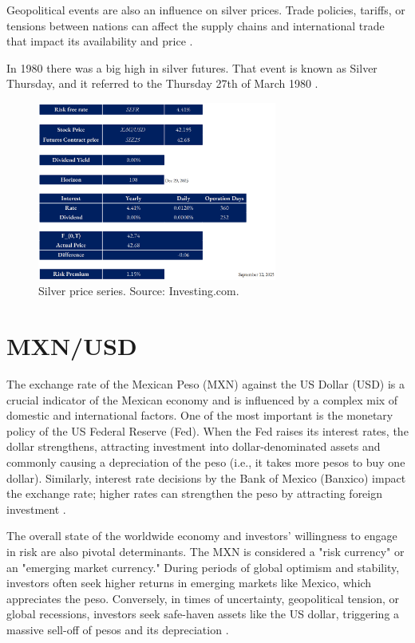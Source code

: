 \documentclass[10pt,a4paper]{article} %
\begin{document}
Geopolitical events are also an influence on silver prices. Trade policies, tariffs, or tensions between nations can affect the supply chains and international trade that impact its availability and price \citep{silver_institute_wss_2024}.

In 1980 there was a big high in silver futures. That event is known as Silver Thursday, and it referred to the Thursday 27th of March 1980 \citep{britannica_silver_thursday,nyt_1980_silver_thursday}.


\begin{figure}[h]
\centering
\includegraphics[width=0.7\textwidth]{figures/silver2.png}
\caption{Silver price series. Source: Investing.com.}
\end{figure}


\section{MXN/USD}
The exchange rate of the Mexican Peso (MXN) against the US Dollar (USD) is a crucial indicator of the Mexican economy and is influenced by a complex mix of domestic and international factors. One of the most important is the monetary policy of the US Federal Reserve (Fed). When the Fed raises its interest rates, the dollar strengthens, attracting investment into dollar-denominated assets and commonly causing a depreciation of the peso (i.e., it takes more pesos to buy one dollar). Similarly, interest rate decisions by the Bank of Mexico (Banxico) impact the exchange rate; higher rates can strengthen the peso by attracting foreign investment \citep{dallasfed_peso_2023,banxico_regional_2024}.

The overall state of the worldwide economy and investors' willingness to engage in risk are also pivotal determinants. The MXN is considered a "risk currency" or an "emerging market currency." During periods of global optimism and stability, investors often seek higher returns in emerging markets like Mexico, which appreciates the peso. Conversely, in times of uncertainty, geopolitical tension, or global recessions, investors seek safe-haven assets like the US dollar, triggering a massive sell-off of pesos and its depreciation \citep{bis_eme_internationalisation_2022}.
\end{document}
